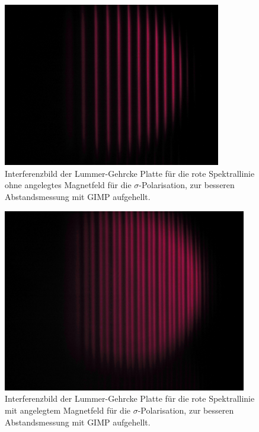 \begin{figure}[h!]
  \centering
  \includegraphics[width=0.85\textwidth]{data/temp/rot_ohneB_0_aufgehellt.JPG}
  \caption{Interferenzbild der Lummer-Gehrcke Platte für die rote Spektrallinie ohne angelegtes Magnetfeld für die $\sigma$-Polarisation, zur besseren Abstandsmessung mit GIMP aufgehellt.}
  \label{fig:rotOhneB0_aufgehellt}
\end{figure}
\begin{figure}[h!]
  \centering
  \includegraphics[width=0.95\textwidth]{data/temp/rot_mitB_0_aufgehellt.JPG}
  \caption{Interferenzbild der Lummer-Gehrcke Platte für die rote Spektrallinie mit angelegtem Magnetfeld für die $\sigma$-Polarisation, zur besseren Abstandsmessung mit GIMP aufgehellt.}
  \label{fig:rotMitB0_aufgehellt}
\end{figure}


